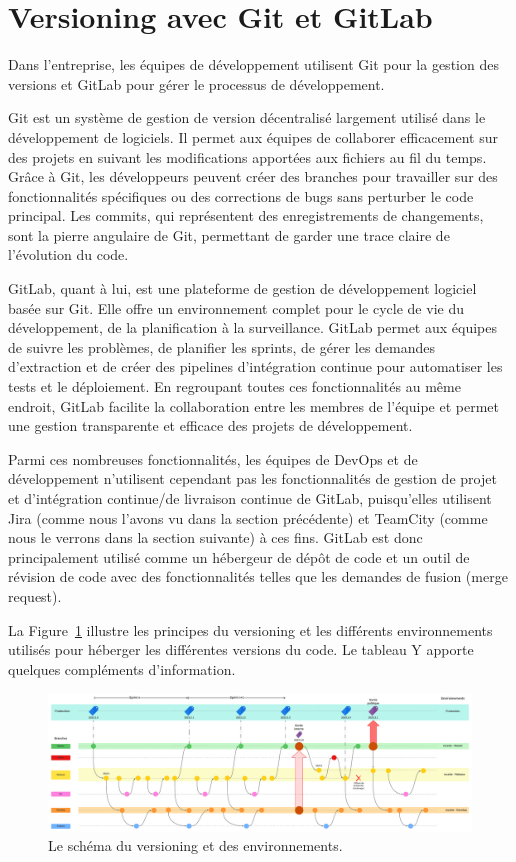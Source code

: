 \section{Versioning avec Git et GitLab}\label{sec:versioning-git-gitlab}

Dans l'entreprise, les équipes de développement utilisent Git pour la gestion des versions et GitLab pour gérer le processus de développement.

Git est un système de gestion de version décentralisé largement utilisé dans le développement de logiciels. Il permet aux équipes de collaborer efficacement sur des projets en suivant les modifications apportées aux fichiers au fil du temps. Grâce à Git, les développeurs peuvent créer des branches pour travailler sur des fonctionnalités spécifiques ou des corrections de bugs sans perturber le code principal. Les commits, qui représentent des enregistrements de changements, sont la pierre angulaire de Git, permettant de garder une trace claire de l'évolution du code.

GitLab, quant à lui, est une plateforme de gestion de développement logiciel basée sur Git. Elle offre un environnement complet pour le cycle de vie du développement, de la planification à la surveillance. GitLab permet aux équipes de suivre les problèmes, de planifier les sprints, de gérer les demandes d'extraction et de créer des pipelines d'intégration continue pour automatiser les tests et le déploiement. En regroupant toutes ces fonctionnalités au même endroit, GitLab facilite la collaboration entre les membres de l'équipe et permet une gestion transparente et efficace des projets de développement.

Parmi ces nombreuses fonctionnalités, les équipes de DevOps et de développement n'utilisent cependant pas les fonctionnalités de gestion de projet et d'intégration continue/de livraison continue de GitLab, puisqu'elles utilisent Jira (comme nous l'avons vu dans la section précédente) et TeamCity (comme nous le verrons dans la section suivante) à ces fins. GitLab est donc principalement utilisé comme un hébergeur de dépôt de code et un outil de révision de code avec des fonctionnalités telles que les demandes de fusion (merge request).

La Figure~\ref{fig:versioning-and-environments} illustre les principes du versioning et les différents environnements utilisés pour héberger les différentes versions du code. Le tableau Y apporte quelques compléments d'information.

\begin{figure}
    \centering
    \includegraphics[width=\textwidth]{img/versioning-and-environments}
    \caption{Le schéma du versioning et des environnements.}
    \label{fig:versioning-and-environments}
\end{figure}

